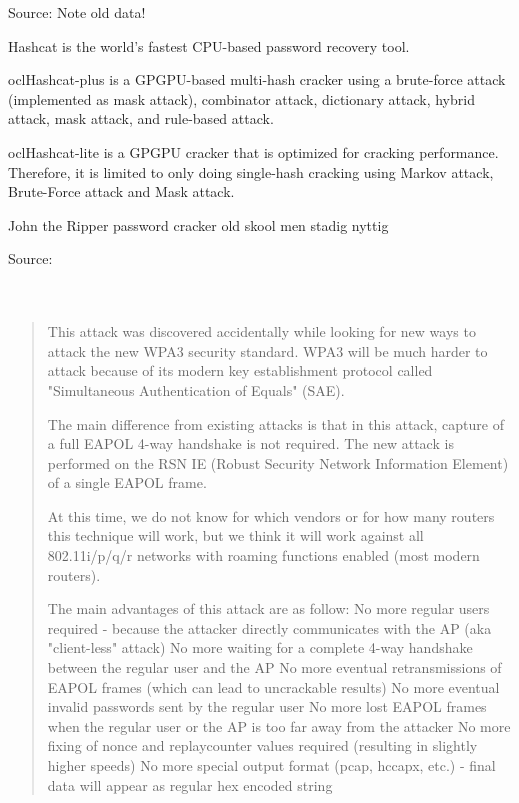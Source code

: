 \documentclass[Screen16to9,17pt]{foils}
\begin{document}


Source:  Note old data!


\begin{list2}
\item Hashcat is the world's fastest CPU-based password recovery tool.
\item oclHashcat-plus is a GPGPU-based multi-hash cracker using a brute-force attack (implemented as mask attack), combinator attack, dictionary attack, hybrid attack, mask attack, and rule-based attack.
\item oclHashcat-lite is a GPGPU cracker that is optimized for cracking performance. Therefore, it is limited to only doing single-hash cracking using Markov attack, Brute-Force attack and Mask attack.
\item John the Ripper password cracker old skool men stadig nyttig
\end{list2}

Source:\\
\\
\\




\begin{quote}\small
This attack was discovered accidentally while looking for new ways to attack the new WPA3 security standard. WPA3 will be much harder to attack because of its modern key establishment protocol called "Simultaneous Authentication of Equals" (SAE).

The main difference from existing attacks is that in this attack, capture of a full EAPOL 4-way handshake is not required. The new attack is performed on the RSN IE (Robust Security Network Information Element) of a single EAPOL frame.

At this time, we do not know for which vendors or for how many routers this technique will work, but we think it will work against all 802.11i/p/q/r networks with roaming functions enabled (most modern routers).

The main advantages of this attack are as follow:
No more regular users required - because the attacker directly communicates with the AP (aka "client-less" attack)
No more waiting for a complete 4-way handshake between the regular user and the AP
No more eventual retransmissions of EAPOL frames (which can lead to uncrackable results)
No more eventual invalid passwords sent by the regular user
No more lost EAPOL frames when the regular user or the AP is too far away from the attacker
No more fixing of nonce and replaycounter values required (resulting in slightly higher speeds)
No more special output format (pcap, hccapx, etc.) - final data will appear as regular hex encoded string
\end{quote}
\end{document}
